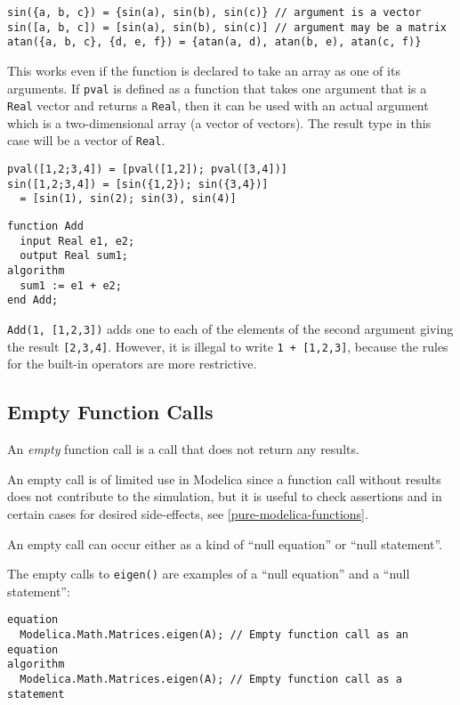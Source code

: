 \begin{example}
\begin{lstlisting}[language=modelica]
sin({a, b, c}) = {sin(a), sin(b), sin(c)} // argument is a vector
sin([a, b, c]) = [sin(a), sin(b), sin(c)] // argument may be a matrix
atan({a, b, c}, {d, e, f}) = {atan(a, d), atan(b, e), atan(c, f)}
\end{lstlisting}
This works even if the function is declared to take an array as
one of its arguments. If \lstinline!pval! is defined as a function that takes
one argument that is a \lstinline!Real! vector and returns a \lstinline!Real!, then it can
be used with an actual argument which is a two-dimensional array (a
vector of vectors). The result type in this case will be a vector of
\lstinline!Real!.
\begin{lstlisting}[language=modelica]
pval([1,2;3,4]) = [pval([1,2]); pval([3,4])]
sin([1,2;3,4]) = [sin({1,2}); sin({3,4})]
  = [sin(1), sin(2); sin(3), sin(4)]
\end{lstlisting}
\begin{lstlisting}[language=modelica]
function Add
  input Real e1, e2;
  output Real sum1;
algorithm
  sum1 := e1 + e2;
end Add;
\end{lstlisting}
\lstinline!Add(1, [1,2,3])! adds one to each of the elements of the second
argument giving the result \lstinline![2,3,4]!. However, it is illegal to
write \lstinline!1 + [1,2,3]!, because the rules for the built-in
operators are more restrictive.
\end{example}

\subsection{Empty Function Calls}\label{empty-function-calls}

An \emph{empty} function call is a call that does not return any results.

\begin{nonnormative}
An empty call is of limited use in Modelica since a function call without results does not contribute to the simulation,
but it is useful to check assertions and in certain cases for desired side-effects, see \cref{pure-modelica-functions}.
\end{nonnormative}

An empty call can occur either as a kind of ``null equation'' or ``null statement''.

\begin{example}
The empty calls to \lstinline!eigen()! are examples of a ``null equation'' and a ``null statement'':
\begin{lstlisting}[language=modelica]
equation
  Modelica.Math.Matrices.eigen(A); // Empty function call as an equation
algorithm
  Modelica.Math.Matrices.eigen(A); // Empty function call as a statement
\end{lstlisting}
\end{example}

